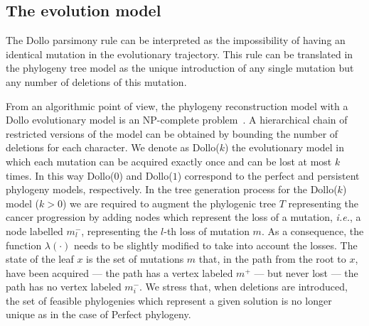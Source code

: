 \documentclass[a4paper,USenglish]{article}
\newcommand{\ie}{\emph{i.e.}}
\theoremstyle{definition}
\begin{document}
\subsection{The evolution model}
\label{sec:intro_dollok}
The Dollo parsimony rule can be interpreted as the impossibility of
having an identical mutation in the evolutionary trajectory.  This
rule can be translated in the phylogeny tree model as the unique
introduction of any single mutation but any number of deletions of
this mutation.

From an algorithmic point of view, the phylogeny reconstruction model
with a Dollo evolutionary model is an NP-complete
problem~\cite{BKW95,DAY198633}.  A hierarchical chain of restricted
versions of the model can be obtained by bounding the number of
deletions for each character.  We denote as Dollo($k$) the
evolutionary model in which each mutation can be acquired exactly once
and can be lost at most $k$ times.  In this way Dollo($0$) and
Dollo($1$) correspond to the perfect and persistent phylogeny models,
respectively.  In the tree generation process for the Dollo($k$) model
($k>0$) we are required to augment the phylogenic tree $T$
representing the cancer progression by adding nodes which represent
the loss of a mutation, \ie, a node labelled $m^-_l$, representing the
$l$-th loss of mutation $m$.  As a consequence, the function
$\lambda(\cdot)$ needs to be slightly modified to take into account
the losses.  The state of the leaf $x$ is the set of mutations $m$
that, in the path from the root to $x$, have been acquired --- the
path has a vertex labeled $m^{+}$ --- but never lost --- the path has
no vertex labeled $m_{i}^{-}$.  We stress that, when deletions are
introduced, the set of feasible phylogenies which represent a given
solution is no longer unique as in the case of Perfect phylogeny.
\end{document}
